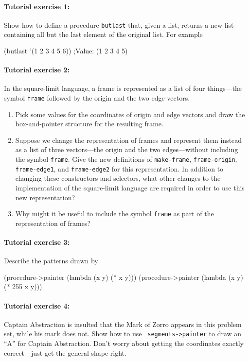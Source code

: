 \documentclass[11pt]{article}
\begin{document}
\paragraph{Tutorial exercise 1:}
Show how to define a procedure {\tt butlast} that, given a list,
returns a new list containing all but the last element of the original
list.  For example

\beginlisp
(butlast '(1 2 3 4 5 6))
;Value: (1 2 3 4 5)
\endlisp

\paragraph{Tutorial exercise 2:}
In the square-limit language, a frame is represented as a list of four
things---the symbol {\tt frame} followed by the origin and the two
edge vectors.

\begin{enumerate}

\item Pick some values for the coordinates of origin and edge vectors
and draw the box-and-pointer structure for the resulting frame.

\item Suppose we change the representation of frames and represent
them instead as a list of three vectors---the origin and the two
edges---without including the symbol {\tt frame}.  Give the new
definitions of {\tt make-frame}, {\tt frame-origin}, {\tt
frame-edge1}, and {\tt frame-edge2} for this representation.  In
addition to changing these constructors and selectors, what other
changes to the implementation of the square-limit language are
required in order to use this new representation?

\item Why might it be useful to include the symbol {\tt frame} as part
of the representation of frames?
\end{enumerate}

\paragraph{Tutorial exercise 3:}
Describe the patterns drawn by

\beginlisp
(procedure->painter (lambda (x y) (* x y)))
(procedure->painter (lambda (x y) (* 255 x y)))
\endlisp

\paragraph{Tutorial exercise 4:}
Captain Abstraction is insulted that the Mark of Zorro appears in this
problem set, while his mark does not.  Show how to use {\tt
segments->painter} to draw an ``A'' for Captain Abstraction.  Don't
worry about getting the coordinates exactly correct---just get the
general shape right.
\end{document}
